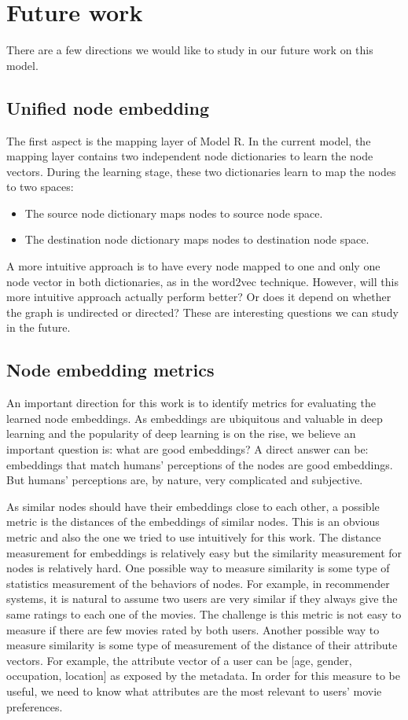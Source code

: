 \documentclass[12pt]{WSUThesis}
\theoremstyle{definition}
\begin{document}
\section{Future work}
There are a few directions we would like to study in our future work on this model.

\subsection{Unified node embedding}

The first aspect is the mapping layer of Model R.
In the current model, the mapping layer contains two independent node dictionaries
to learn the node vectors.
During the learning stage, these two dictionaries learn to map the nodes to two spaces:
\begin{itemize}
	\item The source node dictionary maps nodes to source node space.
	\item The destination node dictionary maps nodes to destination node space.
\end{itemize}
A more intuitive approach is to have every node mapped to
one and only one node vector in both dictionaries,
as in the word2vec technique.
However, will this more intuitive approach actually perform better?
Or does it depend on whether the graph is undirected or directed?
These are interesting questions we can study in the future.

\subsection{Node embedding metrics}
An important direction for this work is to identify metrics for evaluating the learned node embeddings.
As embeddings are ubiquitous and valuable in deep learning and the popularity of deep learning is on the rise, we believe an important question is: what are good embeddings?
A direct answer can be: embeddings that match humans' perceptions of the nodes are good embeddings.
But humans' perceptions are, by nature, very complicated and subjective.

As similar nodes should have their embeddings close to each other, a possible metric is the distances of the embeddings of similar nodes.
This is an obvious metric and also the one we tried to use intuitively for this work.
The distance measurement for embeddings is relatively easy but the similarity measurement for nodes is relatively hard.
One possible way to measure similarity is some type of statistics measurement of the behaviors of nodes.
For example, in recommender systems, it is natural to assume two users are very similar if they always give the same ratings to each one of the movies.
The challenge is this metric is not easy to measure if there are few movies rated by both users.
Another possible way to measure similarity is some type of measurement of the distance of their attribute vectors.
For example, the attribute vector of a user can be [age, gender, occupation, location] as exposed by the metadata.
In order for this measure to be useful, we need to know what attributes are the most relevant to users' movie preferences.
\end{document}
